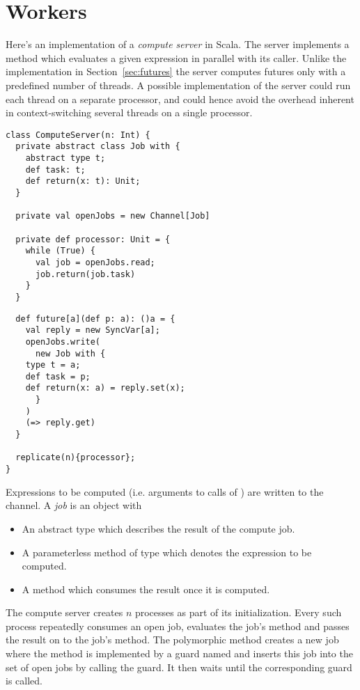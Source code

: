 \documentclass[11pt]{report}
\begin{document}
\section{Workers}

Here's an implementation of a {\em compute server} in Scala. The
server implements a \verb@future@ method which evaluates a given
expression in parallel with its caller. Unlike the implementation in
Section~\ref{sec:futures} the server computes futures only with a
predefined number of threads. A possible implementation of the server
could run each thread on a separate processor, and could hence avoid
the overhead inherent in context-switching several threads on a single
processor.

\begin{verbatim}
class ComputeServer(n: Int) {
  private abstract class Job with {
    abstract type t;
    def task: t;
    def return(x: t): Unit;
  }

  private val openJobs = new Channel[Job]

  private def processor: Unit = {
    while (True) {
      val job = openJobs.read;
      job.return(job.task)
    }
  }
\end{verbatim}
\begin{verbatim}
  def future[a](def p: a): ()a = {
    val reply = new SyncVar[a];
    openJobs.write(
      new Job with {
	type t = a;
	def task = p;
	def return(x: a) = reply.set(x);
      }
    )
    (=> reply.get)
  }

  replicate(n){processor};
}
\end{verbatim}

Expressions to be computed (i.e. arguments
to calls of \verb@future@) are written to the \verb@openJobs@
channel. A {\em job} is an object with
\begin{itemize}
\item
An abstract type \verb@t@ which describes the result of the compute
job.
\item
A parameterless \verb@task@ method of type \verb@t@ which denotes
the expression to be computed.
\item
A \verb@return@ method which consumes the result once it is
computed.
\end{itemize}
The compute server creates $n$ \verb@processor@ processes as part of
its initialization.  Every such process repeatedly consumes an open
job, evaluates the job's \verb@task@ method and passes the result on
to the job's
\verb@return@ method. The polymorphic \verb@future@ method creates
a new job where the \verb@return@ method is implemented by a guard
named \verb@reply@ and inserts this job into the set of open jobs by
calling the \verb@isOpen@ guard. It then waits until the corresponding
\verb@reply@ guard is called.
\end{document}
